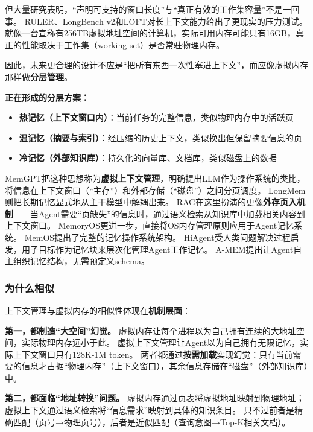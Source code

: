 但大量研究表明，``声明可支持的窗口长度''与``真正有效的工作集容量''不是一回事。
RULER、LongBench v2和LOFT对长上下文能力给出了更现实的压力测试\cite{ruler2024,longbenchv2_2024,loft2024}。
就像一台宣称有256TB虚拟地址空间的计算机，实际可用内存可能只有16GB，真正的性能取决于工作集（working set）是否常驻物理内存。

因此，未来更合理的设计不应是``把所有东西一次性塞进上下文''，而应像虚拟内存那样做\textbf{分层管理}。

\textbf{正在形成的分层方案：}
\begin{itemize}[nosep]
\item \textbf{热记忆（上下文窗口内）}：当前任务的完整信息，类似物理内存中的活跃页
\item \textbf{温记忆（摘要与索引）}：经压缩的历史上下文，类似换出但保留摘要信息的页
\item \textbf{冷记忆（外部知识库）}：持久化的向量库、文档库，类似磁盘上的数据
\end{itemize}

MemGPT把这种思想称为\textbf{虚拟上下文管理}，明确提出LLM作为操作系统的类比，将信息在上下文窗口（``主存''）和外部存储（``磁盘''）之间分页调度\cite{memgpt2023}。
LongMem则把长期记忆显式地从主干模型中解耦出来\cite{longmem2023}。
RAG在这里扮演的更像\textbf{外存页入机制}——当Agent需要``页缺失''的信息时，通过语义检索从知识库中加载相关内容到上下文窗口\cite{lewis2020rag}。
MemoryOS更进一步，直接将OS内存管理原则应用于Agent记忆系统\cite{memoryos2025}。
MemOS提出了完整的记忆操作系统架构\cite{memos2025}。
HiAgent受人类问题解决过程启发，用子目标作为记忆块来层次化管理Agent工作记忆\cite{hiagent2024}。
A-MEM提出让Agent自主组织记忆结构，无需预定义schema\cite{amem2025}。

\subsubsection{为什么相似}

上下文管理与虚拟内存的相似性体现在\textbf{机制层面}：

\textbf{第一，都制造``大空间''幻觉。}
虚拟内存让每个进程以为自己拥有连续的大地址空间，实际物理内存远小于此。
虚拟上下文管理让Agent以为自己拥有无限记忆，实际上下文窗口只有128K-1M token。
两者都通过\textbf{按需加载}实现幻觉：只有当前需要的信息才占据``物理内存''（上下文窗口），其余信息存储在``磁盘''（外部知识库）中。

\textbf{第二，都面临``地址转换''问题。}
虚拟内存通过页表将虚拟地址映射到物理地址；虚拟上下文通过语义检索将``信息需求''映射到具体的知识条目。
只不过前者是精确匹配（页号→物理页号），后者是近似匹配（查询意图→Top-K相关文档）。

